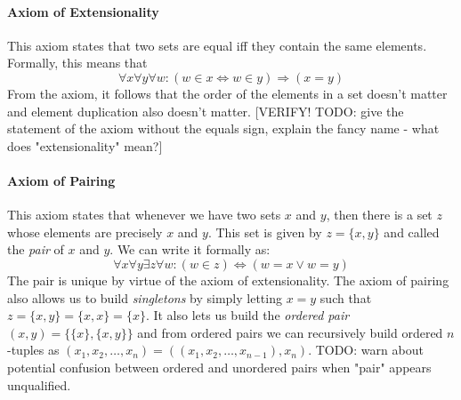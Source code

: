 

\paragraph{Axiom of Extensionality}
This axiom states that two sets are equal iff they contain the same elements. Formally, this means that
\begin{equation}
\forall x \forall y \forall w: 
(w \in x \Leftrightarrow w \in y) \Rightarrow (x = y)
\end{equation}
From the axiom, it follows that the order of the elements in a set doesn't matter and element duplication also doesn't matter. [VERIFY! TODO: give the statement of the axiom without the equals sign, explain the fancy name - what does "extensionality" mean?]



\paragraph{Axiom of Pairing}
This axiom states that whenever we have two sets $x$ and $y$, then there is a set $z$ whose elements are precisely $x$ and $y$. This set is given by $z = \{x, y\}$ and called the \emph{pair} of $x$ and $y$. We can write it formally as:
\begin{equation}
\forall x \forall y \exists z \forall w: (w \in z) \Leftrightarrow (w = x \vee w = y)
\end{equation}
The pair is unique by virtue of the axiom of extensionality. The axiom of pairing also allows us to build \emph{singletons} by simply letting $x = y$ such that  $z = \{x, y\} = \{x, x\} = \{x\}$. It also lets us build the \emph{ordered pair} $(x,y) = \{ \{x\}, \{x, y\} \}$ and from ordered pairs we can recursively build ordered $n$-tuples as $(x_1, x_2, \ldots, x_n) = ((x_1, x_2, \ldots, x_{n-1}), x_n)$. TODO: warn about potential confusion between ordered and unordered pairs when "pair" appears unqualified.

